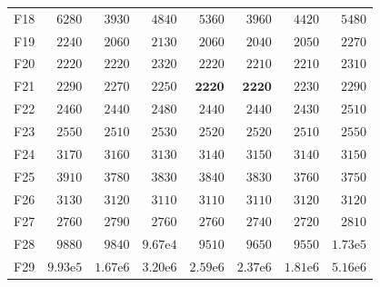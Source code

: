 \begin{tabular}{lrrrrrrr}
F18 & $6280$ & $3930$ & $4840$ & $5360$ & $3960$ & $4420$ & $5480$ \\
F19 & $2240$ & $2060$ & $2130$ & $2060$ & $2040$ & $2050$ & $2270$ \\
F20 & $2220$ & $2220$ & $2320$ & $2220$ & $2210$ & $2210$ & $2310$ \\
F21 & $2290$ & $2270$ & $2250$ & $\mathbf{2220}$ & $\mathbf{2220}$ & $2230$ & $2290$ \\
F22 & $2460$ & $2440$ & $2480$ & $2440$ & $2440$ & $2430$ & $2510$ \\
F23 & $2550$ & $2510$ & $2530$ & $2520$ & $2520$ & $2510$ & $2550$ \\
F24 & $3170$ & $3160$ & $3130$ & $3140$ & $3150$ & $3140$ & $3150$ \\
F25 & $3910$ & $3780$ & $3830$ & $3840$ & $3830$ & $3760$ & $3750$ \\
F26 & $3130$ & $3120$ & $3110$ & $3110$ & $3110$ & $3120$ & $3120$ \\
F27 & $2760$ & $2790$ & $2760$ & $2760$ & $2740$ & $2720$ & $2810$ \\
F28 & $9880$ & $9840$ & $9.67\mathrm{e}{4}$ & $9510$ & $9650$ & $9550$ & $1.73\mathrm{e}{5}$ \\
F29 & $9.93\mathrm{e}{5}$ & $1.67\mathrm{e}{6}$ & $3.20\mathrm{e}{6}$ & $2.59\mathrm{e}{6}$ & $2.37\mathrm{e}{6}$ & $1.81\mathrm{e}{6}$ & $5.16\mathrm{e}{6}$ \\
\bottomrule
\end{tabular}
